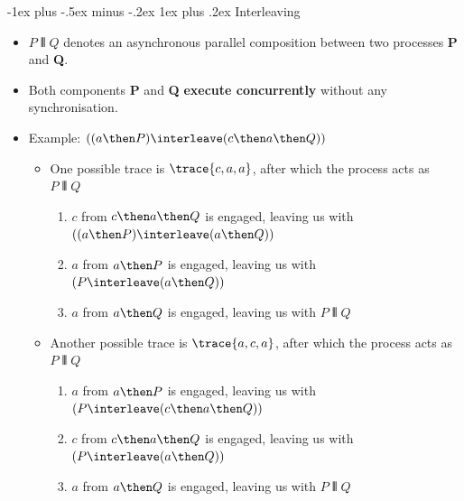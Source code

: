 \documentclass[10pt, landscape]{article}
\makeatletter
\renewcommand{\subsubsection}{\@startsection{subsubsection}{3}{0mm}%
  {-1ex plus -.5ex minus -.2ex}%
  {1ex plus .2ex}%
{\normalfont\small\bfseries}}%
\makeatother
\begin{document}
\begin{multicols*}{3}
  \subsubsection{Interleaving}
  \begin{itemize}
    \item $P \interleave Q$ denotes an asynchronous parallel composition between two processes \textbf{P} and \textbf{Q}.
    \item Both components \textbf{P} and \textbf{Q} \textbf{execute concurrently} without any synchronisation.
    \item Example: $((a \then P) \interleave (c \then a \then Q))$
    \begin{itemize}
      \item One possible trace is $\trace{c, a, a}$, after which the process acts as $P \interleave Q$
      \begin{enumerate}
        \item $c$ from $c \then a \then Q$ is engaged, leaving us with $((a \then P) \interleave (a \then Q))$
        \item $a$ from $a \then P$ is engaged, leaving us with $(P \interleave (a \then Q))$
        \item $a$ from $a \then Q$ is engaged, leaving us with $P \interleave Q$
      \end{enumerate}
      \item Another possible trace is $\trace{a, c, a}$, after which the process acts as $P \interleave Q$
      \begin{enumerate}
        \item $a$ from $a \then P$ is engaged, leaving us with $(P \interleave (c \then a \then Q))$
        \item $c$ from $c \then a \then Q$ is engaged, leaving us with $(P \interleave (a \then Q))$
        \item $a$ from $a \then Q$ is engaged, leaving us with $P \interleave Q$
      \end{enumerate}
    \end{itemize}
  \end{itemize}


\end{multicols*}
\end{document}
